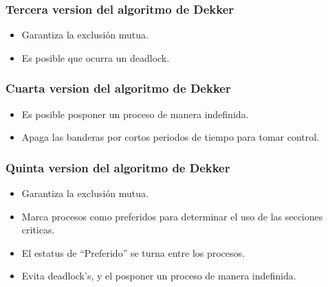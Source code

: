 \documentclass{beamer}
\begin{document}
\begin{frame}
	\frametitle{Tercera version del algoritmo de Dekker}
	
	\begin{itemize}
		\item Garantiza la exclusión mutua.
		\item Es posible que ocurra un deadlock.
		
	\end{itemize}	
\end{frame}


\begin{frame}
	\frametitle{Cuarta version del algoritmo de Dekker}
	
	\begin{itemize}
		\item Es posible posponer un proceso de manera indefinida.
		\item Apaga las banderas por cortos periodos de tiempo para tomar control.
	\end{itemize}
\end{frame}


\begin{frame}
	\frametitle{Quinta version del algoritmo de Dekker}
	
	\begin{itemize}
		\item Garantiza la exclusión mutua.
		\item Marca procesos como preferidos para determinar el uso de las secciones criticas.
		\item El estatus de ``Preferido'' se turna entre los procesos.
		\item Evita deadlock's, y el posponer un proceso de manera indefinida.
	\end{itemize}	
\end{frame}
\end{document}
